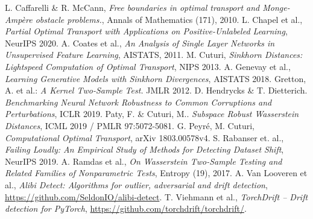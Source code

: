 \documentclass[a4paper,twoside,10pt]{article}
\theoremstyle{plain}
\theoremstyle{remark}
\begin{document}
\begin{thebibliography}{99}
 L. Caffarelli \& R. McCann, \textit{Free boundaries in optimal transport and Monge-Ampère obstacle problems.}, Annals of Mathematics (171), 2010.
 L. Chapel et al., \textit{Partial Optimal Transport with Applications on Positive-Unlabeled Learning}, NeurIPS 2020.
 A. Coates et al., \textit{An Analysis of Single Layer Networks in Unsupervised Feature Learning}, AISTATS, 2011.
 M. Cuturi, \emph{Sinkhorn Distances: Lightspeed Computation of Optimal Transport}, NIPS 2013.
 A. Genevay et al., \emph{Learning Generative Models with Sinkhorn Divergences}, AISTATS 2018.
 Gretton, A. et al.: \emph{A Kernel Two-Sample Test.} JMLR 2012.
 D. Hendrycks \& T. Dietterich. \emph{Benchmarking Neural Network Robustness to Common Corruptions and Perturbations}, ICLR 2019.
  Paty, F. \& Cuturi, M.. \emph{Subspace Robust Wasserstein Distances}, ICML 2019 / PMLR 97:5072-5081.
 G. Peyré, M. Cuturi, \emph{Computational Optimal Transport}, arXiv 1803.00578v4.
 S. Rabanser et. al., \emph{Failing Loudly: An Empirical Study of Methods for Detecting Dataset Shift}, NeurIPS 2019.
 A. Ramdas et al., \emph{On Wasserstein Two-Sample Testing and Related Families of Nonparametric Tests}, Entropy (19), 2017. 
 A. Van Looveren et al., \emph{Alibi Detect: Algorithms for outlier, adversarial and drift detection}, \url{https://github.com/SeldonIO/alibi-detect}.
 T. Viehmann et al., \emph{TorchDrift -- Drift detection for PyTorch}, \url{https://github.com/torchdrift/torchdrift/}.
\end{thebibliography}
\end{document}
